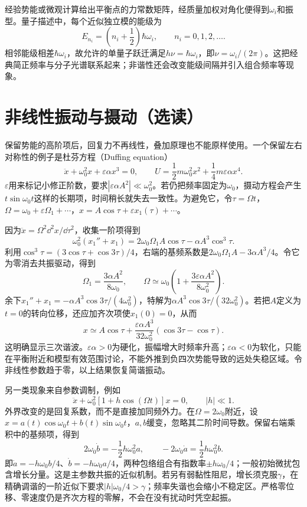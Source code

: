 经验势能或微观计算给出平衡点的力常数矩阵，经质量加权对角化便得到$\omega_i$和振型。量子描述中，每个近似独立模的能级为
\[
 E_{n_i}=\left(n_i+\frac12\right)\hbar\omega_i,\qquad n_i=0,1,2,\ldots.
\]
相邻能级相差$\hbar\omega_i$，故允许的单量子跃迁满足$h\nu=\hbar\omega_i$，即$\nu=\omega_i/(2\pi)$。这把经典简正频率与分子光谱联系起来；非谐性还会改变能级间隔并引入组合频率等现象。

\section{非线性振动与摄动（选读）}\label{ch10:sec:nonlinear}
保留势能的高阶项后，回复力不再线性，叠加原理也不能原样使用。一个保留左右对称性的例子是杜芬方程（Duffing equation）
\[
 \ddot x+\omega_0^2x+\varepsilon\alpha x^3=0,
 \qquad U=\frac12m\omega_0^2x^2+\frac14m\varepsilon\alpha x^4.
\]
$\varepsilon$用来标记小修正阶数，要求$|\varepsilon\alpha A^2|\ll\omega_0^2$。若仍把频率固定为$\omega_0$，摄动方程会产生$t\sin\omega_0t$这样的长期项，时间稍长就失去一致性。为避免它，令$\tau=\Omega t$，$\Omega=\omega_0+\varepsilon\Omega_1+\cdots$，$x=A\cos\tau+\varepsilon x_1(\tau)+\cdots$。

因为$\ddot x=\Omega^2\dd^2x/\dd\tau^2$，收集一阶项得到
\[
 \omega_0^2(x_1''+x_1)=2\omega_0\Omega_1 A\cos\tau-\alpha A^3\cos^3\tau.
\]
利用$\cos^3\tau=(3\cos\tau+\cos3\tau)/4$，右端的基频系数是$2\omega_0\Omega_1A-3\alpha A^3/4$。令它为零消去共振驱动，得到
\[
 \Omega_1=\frac{3\alpha A^2}{8\omega_0},\qquad
 \boxed{\Omega\simeq\omega_0\left(1+\frac{3\varepsilon\alpha A^2}{8\omega_0^2}\right)}.
\]
余下$x_1''+x_1=-\alpha A^3\cos3\tau/(4\omega_0^2)$，特解为$\alpha A^3\cos3\tau/(32\omega_0^2)$。若把$A$定义为$t=0$的转向位移，还应加齐次项使$x_1(0)=0$，从而
\[
 x\simeq A\cos\tau+
 \frac{\varepsilon\alpha A^3}{32\omega_0^2}(\cos3\tau-\cos\tau).
\]
这明确显示三次谐波。$\varepsilon\alpha>0$为硬化，振幅增大时频率升高；$\varepsilon\alpha<0$为软化，只能在平衡附近和模型有效范围讨论，不能外推到负四次势能导致的远处失稳区域。令非线性参数趋于零，以上结果恢复简谐振动。

另一类现象来自参数调制，例如
\[
 \ddot x+\omega_0^2[1+h\cos(\Omega t)]x=0,\qquad |h|\ll1.
\]
外界改变的是回复系数，而不是直接加同频外力。在$\Omega=2\omega_0$附近，设$x=a(t)\cos\omega_0t+b(t)\sin\omega_0t$，$a,b$缓变，忽略其二阶时间导数。保留右端乘积中的基频项，得到
\[
 2\omega_0\dot b=-\frac12h\omega_0^2a,
 \qquad -2\omega_0\dot a=\frac12h\omega_0^2b.
\]
即$\dot a=-h\omega_0b/4$、$\dot b=-h\omega_0a/4$，两种包络组合有指数率$\pm h\omega_0/4$；一般初始微扰包含增长分量。这是主参数共振的近似机制。若另有弱黏性阻尼，增长须克服$\gamma$，在精确调谐的一阶近似下要求$|h|\omega_0/4>\gamma$；频率失谐也会缩小不稳定区。严格零位移、零速度仍是齐次方程的零解，不会在没有扰动时凭空起振。
